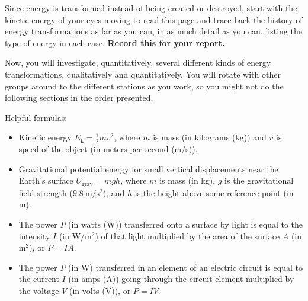 

\begin{steps}
	\item Since energy is transformed instead of being created or destroyed, start with the kinetic energy of your eyes moving to read this page and trace back the history of energy transformations as far as you can, in as much detail as you can, listing the type of energy in each case. \textbf{Record this for your report.}
\end{steps}

\begin{framed}
Now, you will investigate, quantitatively, several different kinds of energy transformations, qualitatively and quantitatively. You will rotate with other groups around to the different stations as you work, so you might not do the following sections in the order presented.
\end{framed}

Helpful formulas:
\begin{itemize}
	\item Kinetic energy $E_\textrm{k} = \frac{1}{2} m v^2$, where $m$ is mass (in kilograms (kg)) and $v$ is speed of the object (in meters per second (m/s)).
	
	\item Gravitational potential energy for small vertical displacements near the Earth's surface $U_\textrm{grav} = m g h$, where $m$ is mass (in kg), $g$ is the gravitational field strength ($9.8\:\textrm{m}/\textrm{s}^2$), and $h$ is the height above some reference point (in m).
	
	\item The power $P$ (in watts (W)) transferred onto a surface by light is equal to the intensity $I$ (in W/m$^2$) of that light multiplied by the area of the surface $A$ (in m$^2$), or $P = I A$.
	
	\item The power $P$ (in W) transferred in an element of an electric circuit is equal to the current $I$ (in amps (A)) going through the circuit element multiplied by the voltage $V$ (in volts (V)), or $P=IV$.
\end{itemize}

